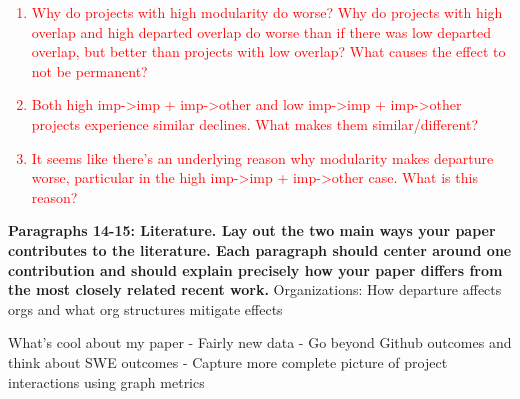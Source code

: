 \documentclass[source/paper/main.tex]{subfiles}
\begin{document}
\textcolor{red}{
\begin{enumerate}
    \item Why do projects with high modularity do worse? Why do projects with high overlap and high departed overlap do worse than if there was low departed overlap, but better than projects with low overlap? What causes the effect to not be permanent?
    \item Both high imp->imp + imp->other and low imp->imp + imp->other projects experience similar declines. What makes them similar/different?
    \item It seems like there's an underlying reason why modularity makes departure worse, particular in the high imp->imp + imp->other case. What is this reason?
\end{enumerate}
}
\textbf{Paragraphs 14-15: Literature. Lay out the two main ways your paper contributes to the literature. Each paragraph should center around one contribution and should explain precisely how your paper differs from the most closely related recent work.}
Organizations: How departure affects orgs and what org structures mitigate effects

What's cool about my paper
- Fairly new data
- Go beyond Github outcomes and think about SWE outcomes
- Capture more complete picture of project interactions using graph metrics
\end{document}
